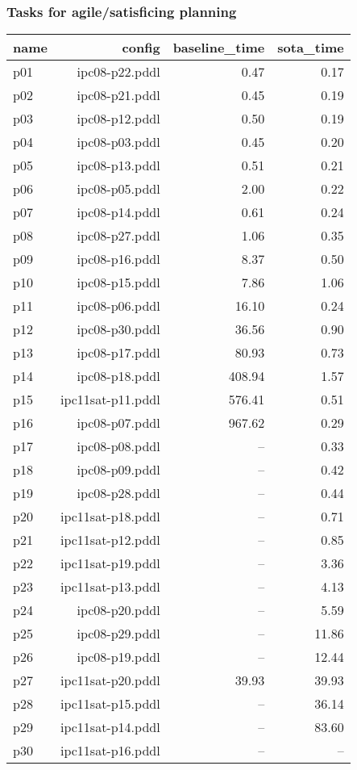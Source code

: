 \documentclass{article}
\begin{document}
                    \subsubsection*{Tasks for agile/satisficing planning}
                    
                            \begin{center}
                            \scriptsize
                            \begin{tabular}{@{}l|r|r|r@{}}
                            name & config & baseline\_time & sota\_time\\\midrule
                              p01& ipc08-p22.pddl&0.47&0.17\\
  p02& ipc08-p21.pddl&0.45&0.19\\
  p03& ipc08-p12.pddl&0.50&0.19\\
  p04& ipc08-p03.pddl&0.45&0.20\\
  p05& ipc08-p13.pddl&0.51&0.21\\
  p06& ipc08-p05.pddl&2.00&0.22\\
  p07& ipc08-p14.pddl&0.61&0.24\\
  p08& ipc08-p27.pddl&1.06&0.35\\
  p09& ipc08-p16.pddl&8.37&0.50\\
  p10& ipc08-p15.pddl&7.86&1.06\\
  p11& ipc08-p06.pddl&16.10&0.24\\
  p12& ipc08-p30.pddl&36.56&0.90\\
  p13& ipc08-p17.pddl&80.93&0.73\\
  p14& ipc08-p18.pddl&408.94&1.57\\
  p15& ipc11sat-p11.pddl&576.41&0.51\\
  p16& ipc08-p07.pddl&967.62&0.29\\
  p17& ipc08-p08.pddl&--&0.33\\
  p18& ipc08-p09.pddl&--&0.42\\
  p19& ipc08-p28.pddl&--&0.44\\
  p20& ipc11sat-p18.pddl&--&0.71\\
  p21& ipc11sat-p12.pddl&--&0.85\\
  p22& ipc11sat-p19.pddl&--&3.36\\
  p23& ipc11sat-p13.pddl&--&4.13\\
  p24& ipc08-p20.pddl&--&5.59\\
  p25& ipc08-p29.pddl&--&11.86\\
  p26& ipc08-p19.pddl&--&12.44\\
  p27& ipc11sat-p20.pddl&39.93&39.93\\
  p28& ipc11sat-p15.pddl&--&36.14\\
  p29& ipc11sat-p14.pddl&--&83.60\\
  p30& ipc11sat-p16.pddl&--&--
                            \end{tabular}
                            \end{center}
                    
\end{document}
